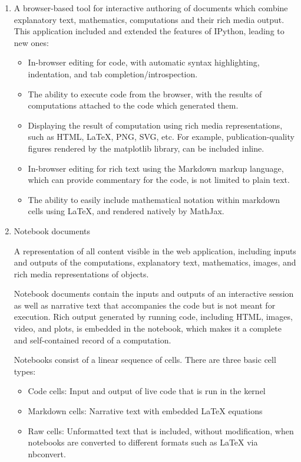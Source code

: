\begin{enumerate}
\item A browser-based tool for interactive authoring of documents which combine
  explanatory text, mathematics, computations and their rich media output. This
  application included and extended the features of IPython, leading to new ones:
  \begin{itemize}
  \item In-browser editing for code, with automatic syntax highlighting, indentation, and
    tab completion/introspection.
  \item The ability to execute code from the browser, with the results of computations
    attached to the code which generated them.
  \item Displaying the result of computation using rich media representations, such as
    HTML, LaTeX, PNG, SVG, etc. For example, publication-quality figures rendered by the
    matplotlib library, can be included inline.
  \item In-browser editing for rich text using the Markdown markup language, which can
    provide commentary for the code, is not limited to plain text.
  \item The ability to easily include mathematical notation within markdown cells using
    LaTeX, and rendered natively by MathJax.
  \end{itemize}
	
\item Notebook documents

  A representation of all content visible in the web application, including inputs and
  outputs of the computations, explanatory text, mathematics, images, and rich media
  representations of objects.


  Notebook documents contain the inputs and outputs of an interactive session as well as
  narrative text that accompanies the code but is not meant for execution. Rich output
  generated by running code, including HTML, images, video, and plots, is embedded in the
  notebook, which makes it a complete and self-contained record of a computation.



  Notebooks consist of a linear sequence of cells. There are three basic cell types:
  \begin{itemize}
  \item Code cells: Input and output of live code that is run in the kernel
  \item Markdown cells: Narrative text with embedded LaTeX equations
  \item Raw cells: Unformatted text that is included, without modification, when notebooks
    are converted to different formats such as LaTeX via nbconvert.
  \end{itemize}


\end{enumerate}
